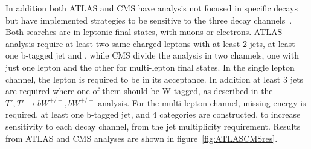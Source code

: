 In addition both ATLAS and CMS have analysis not focused in specific decays but have implemented strategies to be sensitive to the three decay channels~\cite{Aad:2015gdg,Chatrchyan:2013uxa}. Both searches are in leptonic final states, with muons or electrons. ATLAS analysis require at least two same charged leptons with at least 2 jets, at least one b-tagged jet and , while CMS divide the analysis in two channels, one with just one lepton and the other for multi-lepton final states. In the single lepton channel, the lepton is required to be in its acceptance. In addition at least 3 jets are required where one of them should be W-tagged, as described in the ${T',T'\rightarrow bW^{+/-},bW^{+/-}}$ analysis. For the multi-lepton channel, missing energy is required, at least one b-tagged jet, and 4 categories are constructed, to increase sensitivity to each decay channel, from the jet multiplicity requirement. Results from ATLAS and CMS analyses are shown in figure~\ref{fig:ATLASCMSres}.
%

